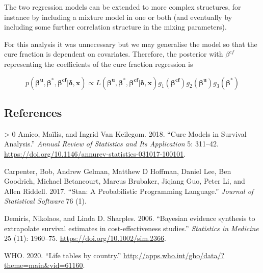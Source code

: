 \documentclass[
]{article}
\newlength{\cslhangindent}
\newenvironment{CSLReferences}[3] %
 {%
  \setlength{\parindent}{0pt}
  \ifodd #1 \everypar{\setlength{\hangindent}{\cslhangindent}}\ignorespaces\fi
  \ifnum #2 > 0
  \setlength{\parskip}{#2\baselineskip}
  \fi
 }%
 {}
\begin{document}
The two regression models can be extended to more complex structures,
for instance by including a mixture model in one or both (and eventually
by including some further correlation structure in the mixing
parameters).

For this analysis it was unnecessary but we may generalise the model so
that the cure fraction is dependent on covariates. Therefore, the
posterior with \(\beta^{cf}\) representing the coefficients of the cure
fraction regression is

\[
p(\boldsymbol{\beta^u},\boldsymbol{\beta^*}, \boldsymbol{\beta^{cf}} | \boldsymbol{\delta}, \boldsymbol{x}) \propto L(\boldsymbol{\beta^u},\boldsymbol{\beta^*}, \boldsymbol{\beta^{cf}} | \boldsymbol{\delta}, \boldsymbol{x}) g_1(\boldsymbol{\beta^{cf}})  g_2(\boldsymbol{\beta^u}) g_3(\boldsymbol{\beta^*})
\]

\hypertarget{references}{%
\subsection*{References}\label{references}}

\hypertarget{refs}{}
\begin{CSLReferences}{1}{0}
\leavevmode\hypertarget{ref-Amico2018}{}%
Amico, Maïlis, and Ingrid Van Keilegom. 2018. {``{Cure Models in
Survival Analysis}.''} \emph{Annual Review of Statistics and Its
Application} 5: 311--42.
\url{https://doi.org/10.1146/annurev-statistics-031017-100101}.

\leavevmode\hypertarget{ref-carpenter2017stan}{}%
Carpenter, Bob, Andrew Gelman, Matthew D Hoffman, Daniel Lee, Ben
Goodrich, Michael Betancourt, Marcus Brubaker, Jiqiang Guo, Peter Li,
and Allen Riddell. 2017. {``Stan: A Probabilistic Programming
Language.''} \emph{Journal of Statistical Software} 76 (1).

\leavevmode\hypertarget{ref-Demiris2006}{}%
Demiris, Nikolaos, and Linda D. Sharples. 2006. {``{Bayesian evidence
synthesis to extrapolate survival estimates in cost-effectiveness
studies}.''} \emph{Statistics in Medicine} 25 (11): 1960--75.
\url{https://doi.org/10.1002/sim.2366}.

\leavevmode\hypertarget{ref-wholifetables}{}%
WHO. 2020. {``{Life tables by country}.''}
\url{http://apps.who.int/gho/data/?theme=main\&vid=61160}.

\end{CSLReferences}
\end{document}
